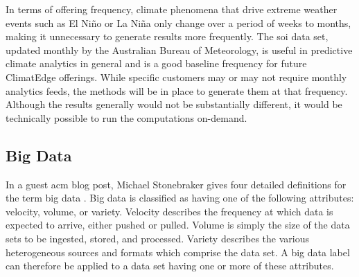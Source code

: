 In terms of offering frequency, climate phenomena that drive extreme weather events such as El Niño or La Niña only change over a period of weeks to months, making it unnecessary to generate results more frequently. The \gls{soi} data set, updated monthly by the Australian Bureau of Meteorology, is useful in predictive climate analytics in general and is a good baseline frequency for future ClimatEdge offerings. While specific customers may or may not require monthly analytics feeds, the methods will be in place to generate them at that frequency. Although the results generally would not be substantially different, it would be technically possible to run the computations on-demand.
\subsection{Big Data}
In a guest \gls{acm} blog post, Michael Stonebraker gives four detailed definitions for the term big data \cite{stonebraker}. Big data is classified as having one of the following attributes: velocity, volume, or variety. Velocity describes the frequency at which data is expected to arrive, either pushed or pulled. Volume is simply the size of the data sets to be ingested, stored, and processed. Variety describes the various heterogeneous sources and formats which comprise the data set. A big data label can therefore be applied to a data set having  one or more of these attributes.\\

